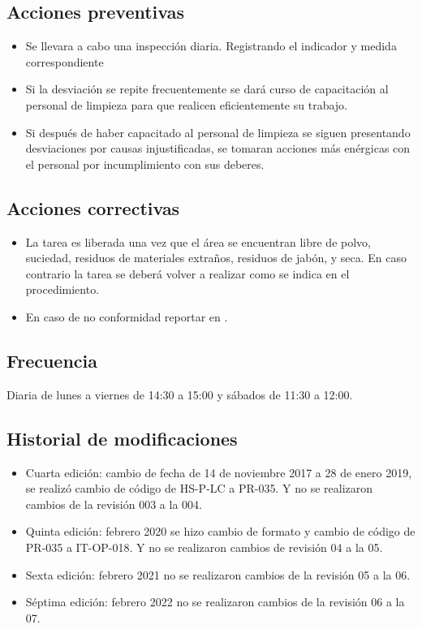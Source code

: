 \subsection{Acciones preventivas}

\begin{itemize}
	\item Se llevara a cabo una inspección diaria. Registrando el indicador y medida correspondiente
	\item Si la desviación se repite frecuentemente se dará curso de capacitación al personal de limpieza para que realicen eficientemente su trabajo.
	\item Si después de haber capacitado al personal de limpieza se siguen presentando desviaciones por causas injustificadas, se tomaran acciones más enérgicas con el personal por incumplimiento con sus deberes.
\end{itemize}

\subsection{Acciones correctivas}

\begin{itemize}
	\item La tarea es liberada una vez que el área se encuentran libre de polvo, suciedad, residuos de materiales extraños, residuos de jabón, y seca. En caso contrario la tarea se deberá volver a realizar como se indica en el procedimiento.
	\item En caso de no conformidad reportar en \RAC.
\end{itemize}

\subsection{Frecuencia}

Diaria de lunes a viernes de 14:30 a 15:00 y sábados de 11:30 a 12:00.

\subsection{Historial de modificaciones}

\begin{itemize}
	\item Cuarta edición: cambio de fecha de 14 de noviembre 2017 a 28 de enero 2019, se realizó cambio de código de HS-P-LC a PR-035. Y no se realizaron cambios de la revisión 003 a la 004.
	\item Quinta edición: febrero 2020 se hizo cambio de formato y cambio de código de PR-035 a IT-OP-018. Y no se realizaron cambios de revisión 04 a la 05.
	\item Sexta edición: febrero 2021 no se realizaron cambios de la revisión 05 a la 06.
	\item Séptima edición: febrero 2022 no se realizaron cambios de la revisión 06 a la 07.
\end{itemize}
